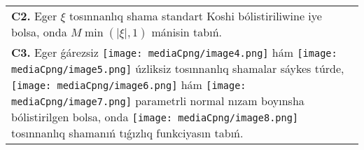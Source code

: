 \documentclass{article}
\begin{document}
\begin{tabular}{m{17cm}}
 \\
\textbf{C2.} Eger \(\xi\) tosınnanlıq shama standart Koshi bólistiriliwine iye bolsa, onda \(M\min\left( |\xi|,1 \right)\) mánisin tabıń.
 \\
\textbf{C3.} Eger ǵárezsiz \texttt{[image: mediaCpng/image4.png]} hám \texttt{[image: mediaCpng/image5.png]} úzliksiz tosınnanlıq shamalar sáykes túrde, \texttt{[image: mediaCpng/image6.png]} hám \texttt{[image: mediaCpng/image7.png]} parametrli normal nızam boyınsha bólistirilgen bolsa, onda \texttt{[image: mediaCpng/image8.png]} tosınnanlıq shamanıń tıǵızlıq funkciyasın tabıń.
 \\

\end{tabular}
\vspace{1cm}
\end{document}
